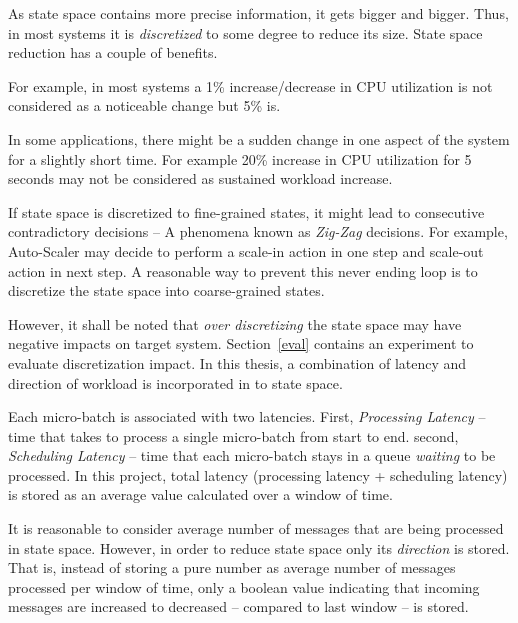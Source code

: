 As state space contains more precise information, it gets bigger and bigger. Thus, in most systems it is \emph{discretized} to some degree to reduce its size. State space reduction has a couple of benefits.
\begin{description}[leftmargin=0pt]
    \item[Change Observation] For example, in most systems a 1\% increase/decrease in CPU utilization is not considered as a noticeable change but 5\% is.
    \item[Absorbing Sudden Bursts] In some applications, there might be a sudden change in one aspect of the system for a slightly short time. For example 20\% increase in CPU utilization for 5 seconds may not be considered as sustained workload increase.
    \item[Preventing Zig-Zag Decisions] If state space is discretized to fine-grained states, it might lead to consecutive contradictory decisions -- A phenomena known as \emph{Zig-Zag} decisions. For example, Auto-Scaler may decide to perform a scale-in action in one step and scale-out action in next step. A reasonable way to prevent this never ending loop is to discretize the state space into coarse-grained states.
\end{description}
However, it shall be noted that \emph{over discretizing} the state space may have negative impacts on target system. Section~\ref{eval} contains an experiment to evaluate discretization impact. In this thesis, a combination of latency and direction of workload is incorporated in to state space.
\begin{description}[leftmargin=0pt]
    \item[Latency] Each micro-batch is associated with two latencies. First, \emph{Processing Latency} -- time that takes to process a single micro-batch from start to end. second, \emph{Scheduling Latency} -- time that each micro-batch stays in a queue \emph{waiting} to be processed. In this project, total latency (processing latency + scheduling latency) is stored as an average value calculated over a window of time.
    \item[Workload Direction] It is reasonable to consider average number of messages that are being processed in state space. However, in order to reduce state space only its \emph{direction} is stored. That is, instead of storing a pure number as average number of messages processed per window of time, only a boolean value indicating that incoming messages are increased to decreased -- compared to last window -- is stored.
\end{description}

